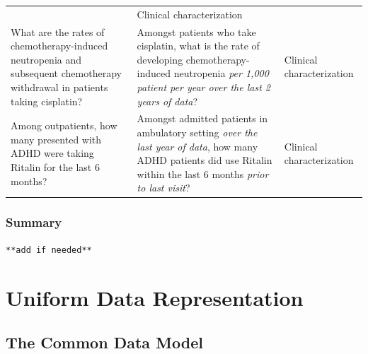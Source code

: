 \documentclass[11pt]{book}
\theoremstyle{definition}
\theoremstyle{definition}
\theoremstyle{definition}
\theoremstyle{remark}
\begin{document}
\begin{longtable}[]{@{}lll@{}}
\begin{minipage}[t]{0.30\columnwidth}
\end{minipage} & \begin{minipage}[t]{0.30\columnwidth}\raggedright
Clinical characterization\strut
\end{minipage}\tabularnewline
\begin{minipage}[t]{0.30\columnwidth}\raggedright
What are the rates of chemotherapy-induced neutropenia and subsequent chemotherapy withdrawal in patients taking cisplatin?\strut
\end{minipage} & \begin{minipage}[t]{0.30\columnwidth}\raggedright
Amongst patients who take cisplatin, what is the rate of developing chemotherapy-induced neutropenia \emph{per 1,000 patient per year over the last 2 years of data}?\strut
\end{minipage} & \begin{minipage}[t]{0.30\columnwidth}\raggedright
Clinical characterization\strut
\end{minipage}\tabularnewline
\begin{minipage}[t]{0.30\columnwidth}\raggedright
Among outpatients, how many presented with ADHD were taking Ritalin for the last 6 months?\strut
\end{minipage} & \begin{minipage}[t]{0.30\columnwidth}\raggedright
Amongst admitted patients in ambulatory setting \emph{over the last year of data}, how many ADHD patients did use Ritalin within the last 6 months \emph{prior to last visit}?\strut
\end{minipage} & \begin{minipage}[t]{0.30\columnwidth}\raggedright
Clinical characterization\strut
\end{minipage}\tabularnewline
\bottomrule
\end{longtable}

\hypertarget{summary-1}{%
\section{Summary}\label{summary-1}}

\texttt{**add\ if\ needed**}

\hypertarget{part-uniform-data-representation}{%
\part{Uniform Data Representation}\label{part-uniform-data-representation}}

\hypertarget{CommonDataModel}{%
\chapter{The Common Data Model}\label{CommonDataModel}}
\end{document}
